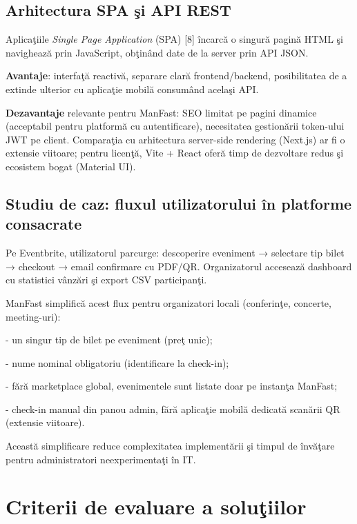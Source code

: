 \subsection{Arhitectura SPA \c si API REST}

Aplica\c tiile \textit{Single Page Application} (SPA) [8] \^incarc\u a o singur\u a pagin\u a HTML \c si navigheaz\u a prin JavaScript, ob\c tin\^and date de la server prin API JSON.

 \textbf{Avantaje}: interfa\c t\u a reactiv\u a, separare clar\u a frontend/backend, posibilitatea de a extinde ulterior cu aplica\c tie mobil\u a consum\^and acela\c si API.

\textbf{Dezavantaje} relevante pentru ManFast: SEO limitat pe pagini dinamice (acceptabil pentru platform\u a cu autentificare), necesitatea gestion\u arii token-ului JWT pe client. Compara\c tia cu arhitectura server-side rendering (Next.js) ar fi o extensie viitoare; pentru licen\c t\u a, Vite + React ofer\u a timp de dezvoltare redus \c si ecosistem bogat (Material UI).

\subsection{Studiu de caz: fluxul utilizatorului \^in platforme consacrate}

Pe Eventbrite, utilizatorul parcurge: descoperire eveniment → selectare tip bilet → checkout → email confirmare cu PDF/QR. Organizatorul acceseaz\u a dashboard cu statistici v\^anz\u ari \c si export CSV participan\c ti.

ManFast simplific\u a acest flux pentru organizatori locali (conferin\c te, concerte, meeting-uri):

- un singur tip de bilet pe eveniment (pre\c t unic);

- nume nominal obligatoriu (identificare la check-in);

- f\u ar\u a marketplace global, evenimentele sunt listate doar pe instan\c ta ManFast;

- check-in manual din panou admin, f\u ar\u a aplica\c tie mobil\u a dedicat\u a scan\u arii QR (extensie viitoare).

Aceast\u a simplificare reduce complexitatea implement\u arii \c si timpul de \^inv\u a\c tare pentru administratori neexperimenta\c ti \^in IT.

\section{Criterii de evaluare a solu\c tiilor}

